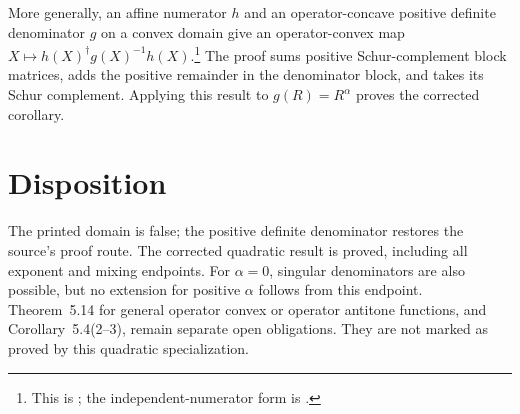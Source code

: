 \documentclass{article}
\begin{document}
More generally, an affine numerator $h$ and an operator-concave positive definite
denominator $g$ on a convex domain give an operator-convex map
$X\mapsto h(X)^\dagger g(X)^{-1}h(X)$.\footnote{This is
; the independent-numerator
form is .}
The proof sums positive Schur-complement block matrices, adds the positive
remainder in the denominator block, and takes its Schur complement.
Applying this result to $g(R)=R^\alpha$ proves the corrected corollary.

\section{Disposition}
The printed domain is false; the positive definite denominator restores the
source's proof route. The corrected quadratic result is proved, including all
exponent and mixing endpoints. For $\alpha=0$, singular denominators are also
possible, but no extension for positive $\alpha$ follows from this endpoint.
Theorem~5.14 for general operator convex or operator antitone functions, and
Corollary~5.4(2--3), remain separate open obligations. They are not marked as
proved by this quadratic specialization.
\end{document}

